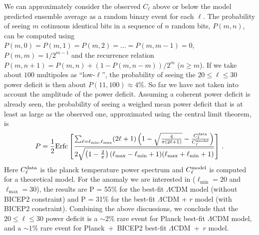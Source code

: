 \documentclass[11pt]{article}
\begin{document}
We can approximately consider the observed $C_\ell$ above or below the model predicted ensemble average as a random binary event for each $\ell$. The probability of seeing $m$ cotinuous identical bits in a sequence of $n$ random bits, $P(m, n)$, can be computed using $P(m, 0) = P(m, 1) = P(m, 2) = \ldots = P(m, m-1) = 0$, $P(m, m) = 1/2^{m-1}$ and the recurrence relation $P(m, n+1 ) = P(m, n) + (1-P(m, n-m))/2^m$ ($n\ge m$). If we take about $100$ multipoles as ``low-$\ell$'', the probability of seeing the $20\le \ell \le 30$ power deficit is then about $P(11, 100)\approx 4\%$. So far we have not taken into account the amplitude of the power deficit. Assuming a coherent power deficit is already seen, the probability of seeing a weighed mean power deficit that is at least as large as the observed one, approximated using the central limit theorem, is 
\begin{equation}
  P = \frac{1}{2}{\rm Erfc}\left[\frac{\sum_{\ell = \ell_{\min}, \ell_{\max}} (2\ell+1)\left(  1 - \sqrt{\frac{4}{\pi(2\ell+1)}} -  \frac{C_\ell^{\rm data}}{C_\ell^{\rm model}}\right)}{2\sqrt{\left(1-\frac{2}{\pi}\right)(\ell_{\max}-\ell_{\min}+1)(\ell_{\max}+\ell_{\min}+1)}}\right] \, .
\end{equation}
Here $C_\ell^{\rm data}$ is the planck temperature power spectrum and $C_\ell^{\rm model}$ is computed for a theoretical model. For the anomaly we are interested in ($\ell_{\min} = 20$ and $\ell_{\max}=30$), the results are P = 55\% for the best-fit $\Lambda$CDM model (without BICEP2 constraint) and P = 31\% for the best-fit $\Lambda$CDM + $r$ model (with BICEP2 constraint). Combining the above discussions, we conclude that the $20\le\ell\le 30$ power deficit is a $\sim 2\%$ rare event for Planck best-fit $\Lambda$CDM model, and a $\sim 1\%$ rare event for Planck~+~BICEP2 best-fit $\Lambda$CDM~+~$r$ model. 
\end{document}
